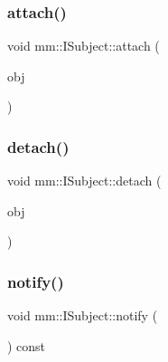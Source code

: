\subsubsection{\texorpdfstring{attach()}{attach()}}
{\footnotesize\ttfamily void mm\+::\+I\+Subject\+::attach (\begin{DoxyParamCaption}\item[{\mbox{\hyperlink{classmm_1_1_i_observer}{mm\+::\+I\+Observer}} $\ast$}]{obj }\end{DoxyParamCaption})\hspace{0.3cm}{\ttfamily [noexcept]}}

\mbox{\label{classmm_1_1_i_subject_a64be1c0b2ad7ee4631a5270dedb7aa88}} 
\subsubsection{\texorpdfstring{detach()}{detach()}}
{\footnotesize\ttfamily void mm\+::\+I\+Subject\+::detach (\begin{DoxyParamCaption}\item[{\mbox{\hyperlink{classmm_1_1_i_observer}{mm\+::\+I\+Observer}} $\ast$}]{obj }\end{DoxyParamCaption})\hspace{0.3cm}{\ttfamily [noexcept]}}

\mbox{\label{classmm_1_1_i_subject_ad693fe5eb99bc20bc6d70f30bdf1140d}} 
\subsubsection{\texorpdfstring{notify()}{notify()}\hspace{0.1cm}{\footnotesize\ttfamily [1/2]}}
{\footnotesize\ttfamily void mm\+::\+I\+Subject\+::notify (\begin{DoxyParamCaption}{ }\end{DoxyParamCaption}) const}

\mbox{\label{classmm_1_1_i_subject_a6c77bad76084018ccb79106390d97117}} 
